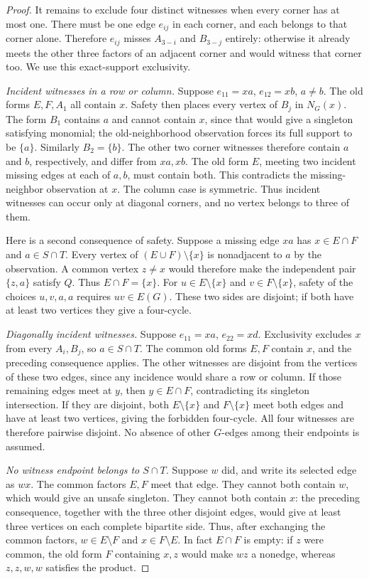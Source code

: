\documentclass[11pt]{article}
\theoremstyle{definition}
\theoremstyle{remark}
\begin{document}
\begin{proof}
It remains to exclude four distinct witnesses when every corner has at most
one. There must be one edge $e_{ij}$ in each corner, and each belongs to that
corner alone. Therefore $e_{ij}$ misses $A_{3-i}$ and $B_{3-j}$ entirely:
otherwise it already meets the other three factors of an adjacent corner
and would witness that corner too. We use this exact-support exclusivity.

\emph{Incident witnesses in a row or column.} Suppose
$e_{11}=xa$, $e_{12}=xb$, $a\ne b$. The old forms $E,F,A_1$ all contain
$x$. Safety then places every vertex of $B_j$ in $N_G(x)$. The form $B_1$
contains $a$ and cannot contain $x$, since that would give a singleton
satisfying monomial; the old-neighborhood observation forces its full support
to be $\{a\}$. Similarly $B_2=\{b\}$. The other two corner witnesses
therefore contain $a$ and $b$, respectively, and differ from $xa,xb$.
The old form $E$, meeting two incident missing edges at each of $a,b$,
must contain both. This contradicts the missing-neighbor observation at
$x$. The column case is symmetric. Thus incident witnesses can occur only
at diagonal corners, and no vertex belongs to three of them.

Here is a second consequence of safety. Suppose a missing edge $xa$ has
$x\in E\cap F$ and $a\in S\cap T$. Every vertex of
$(E\cup F)\setminus\{x\}$ is nonadjacent to $a$ by the observation.
A common vertex $z\ne x$ would therefore make the independent pair
$\{z,a\}$ satisfy $Q$. Thus $E\cap F=\{x\}$.
For $u\in E\setminus\{x\}$ and $v\in F\setminus\{x\}$, safety of
the choices $u,v,a,a$ requires $uv\in E(G)$. These two sides are disjoint;
if both have at least two vertices they give a four-cycle.

\emph{Diagonally incident witnesses.} Suppose $e_{11}=xa$, $e_{22}=xd$.
Exclusivity excludes $x$ from every $A_i,B_j$, so $a\in S\cap T$.
The common old forms $E,F$ contain $x$, and the preceding consequence
applies. The other witnesses are disjoint from the vertices of these two
edges, since any incidence would share a row or column. If those remaining
edges meet at $y$, then $y\in E\cap F$, contradicting its singleton
intersection. If they are disjoint, both $E\setminus\{x\}$ and
$F\setminus\{x\}$ meet both edges and have at least two vertices, giving
the forbidden four-cycle. All four witnesses are therefore pairwise
disjoint. No absence of other $G$-edges among their endpoints is assumed.

\emph{No witness endpoint belongs to $S\cap T$.} Suppose $w$ did, and
write its selected edge as $wx$. The common factors $E,F$ meet that edge.
They cannot both contain $w$, which would give an unsafe singleton. They
cannot both contain $x$: the preceding consequence, together with the three
other disjoint edges, would give at least three vertices on each complete
bipartite side. Thus, after exchanging the common factors,
$w\in E\setminus F$ and $x\in F\setminus E$.
In fact $E\cap F$ is empty: if $z$ were common, the old form $F$ containing
$x,z$ would make $wz$ a nonedge, whereas $z,z,w,w$ satisfies the product.


\end{proof}
\end{document}
